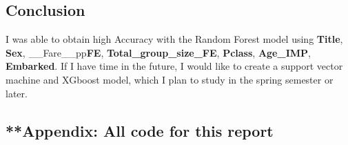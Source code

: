 \documentclass[
]{article}
\begin{document}
\hypertarget{conclusion}{%
\subsection{\texorpdfstring{\textbf{Conclusion}}{Conclusion}}\label{conclusion}}

I was able to obtain high Accuracy with the Random Forest model using
\textbf{Title}, \textbf{Sex}, \_\_Fare\_\_pp\textbf{FE},
\textbf{Total\_group\_size\_FE}, \textbf{Pclass}, \textbf{Age\_IMP},
\textbf{Embarked}. If I have time in the future, I would like to create
a support vector machine and XGboost model, which I plan to study in the
spring semester or later.

\hypertarget{appendix-all-code-for-this-report}{%
\subsection{**Appendix: All code for this
report}\label{appendix-all-code-for-this-report}}
\end{document}
